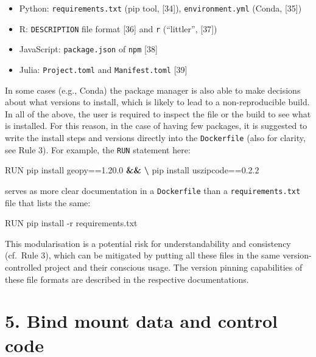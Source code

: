 \documentclass[10pt,letterpaper]{article}
\newenvironment{Shaded}{\begin{snugshade}}{\end{snugshade}}
\newcommand{\ExtensionTok}[1]{#1}
\newcommand{\KeywordTok}[1]{\textcolor[rgb]{0.13,0.29,0.53}{\textbf{#1}}}
\newcommand{\NormalTok}[1]{#1}
\providecommand{\tightlist}{%
  \setlength{\itemsep}{0pt}\setlength{\parskip}{0pt}}
\begin{document}
\begin{itemize}
\tightlist
\item
  Python: \texttt{requirements.txt} (pip tool, {[}34{]}),
  \texttt{environment.yml} (Conda, {[}35{]})
\item
  R: \texttt{DESCRIPTION} file format {[}36{]} and \texttt{r}
  (``littler'', {[}37{]})
\item
  JavaScript: \texttt{package.json} of \texttt{npm} {[}38{]}
\item
  Julia: \texttt{Project.toml} and \texttt{Manifest.toml} {[}39{]}
\end{itemize}

In some cases (e.g., Conda) the package manager is also able to make
decisions about what versions to install, which is likely to lead to a
non-reproducible build. In all of the above, the user is required to
inspect the file or the build to see what is installed. For this reason,
in the case of having few packages, it is suggested to write the install
steps and versions directly into the \texttt{Dockerfile} (also for
clarity, see Rule 3). For example, the \texttt{RUN} statement here:

\begin{Shaded}
\begin{Highlighting}[]
\ExtensionTok{RUN}\NormalTok{ pip install geopy==1.20.0 }\KeywordTok{&&} \KeywordTok{\textbackslash{}}
    \ExtensionTok{pip}\NormalTok{ install uszipcode==0.2.2}
\end{Highlighting}
\end{Shaded}

serves as more clear documentation in a \texttt{Dockerfile} than a
\texttt{requirements.txt} file that lists the same:

\begin{Shaded}
\begin{Highlighting}[]
\ExtensionTok{RUN}\NormalTok{ pip install -r requirements.txt}
\end{Highlighting}
\end{Shaded}

This modularisation is a potential risk for understandability and
consistency (cf.~Rule 3), which can be mitigated by putting all these
files in the same version-controlled project and their conscious usage.
The version pinning capabilities of these file formats are described in
the respective documentations.

\hypertarget{bind-mount-data-and-control-code}{%
\section*{5. Bind mount data and control
code}\label{bind-mount-data-and-control-code}}
\end{document}
